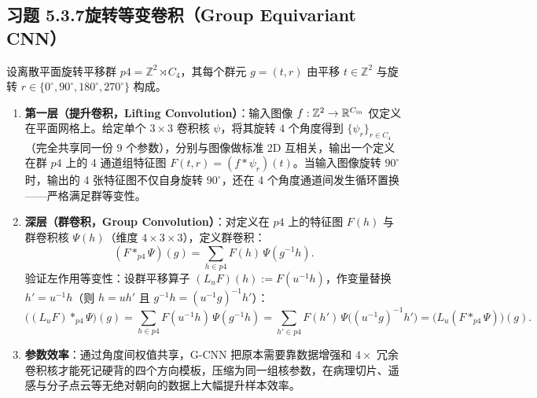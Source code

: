 \subsection*{习题 5.3.7\quad 旋转等变卷积（Group Equivariant CNN）}
设离散平面旋转平移群 $p4 = \mathbb{Z}^2 \rtimes C_4$，其每个群元 $g = (t, r)$ 由平移 $t \in \mathbb{Z}^2$ 与旋转 $r \in \{0^\circ, 90^\circ, 180^\circ, 270^\circ\}$ 构成。
\begin{enumerate}[label=(\arabic*), leftmargin=1.8em]
  \item \textbf{第一层（提升卷积，Lifting Convolution）}：输入图像 $f: \mathbb{Z}^2 \to \mathbb{R}^{C_{\text{in}}}$ 仅定义在平面网格上。给定单个 $3\times 3$ 卷积核 $\psi$，将其旋转 $4$ 个角度得到 $\{\psi_r\}_{r \in C_4}$（完全共享同一份 $9$ 个参数），分别与图像做标准 2D 互相关，输出一个定义在群 $p4$ 上的 4 通道组特征图 $F(t, r) = (f * \psi_r)(t)$。当输入图像旋转 $90^\circ$ 时，输出的 4 张特征图不仅自身旋转 $90^\circ$，还在 4 个角度通道间发生循环置换——严格满足群等变性。
  \item \textbf{深层（群卷积，Group Convolution）}：对定义在 $p4$ 上的特征图 $F(h)$ 与群卷积核 $\Psi(h)$（维度 $4 \times 3 \times 3$），定义群卷积：
  \[
    (F *_{p4} \Psi)(g) = \sum_{h \in p4} F(h)\,\Psi(g^{-1} h).
  \]
  验证左作用等变性：设群平移算子 $(L_u F)(h) := F(u^{-1} h)$，作变量替换 $h' = u^{-1} h$（则 $h = u h'$ 且 $g^{-1} h = (u^{-1} g)^{-1} h'$）：
  \[
    \big((L_u F) *_{p4} \Psi\big)(g)
    = \sum_{h \in p4} F(u^{-1} h)\,\Psi(g^{-1} h)
    = \sum_{h' \in p4} F(h')\,\Psi\big((u^{-1} g)^{-1} h'\big)
    = \big(L_u(F *_{p4} \Psi)\big)(g).
  \]
  \item \textbf{参数效率}：通过角度间权值共享，G-CNN 把原本需要靠数据增强和 $4\times$ 冗余卷积核才能死记硬背的四个方向模板，压缩为同一组核参数，在病理切片、遥感与分子点云等无绝对朝向的数据上大幅提升样本效率。
\end{enumerate}


